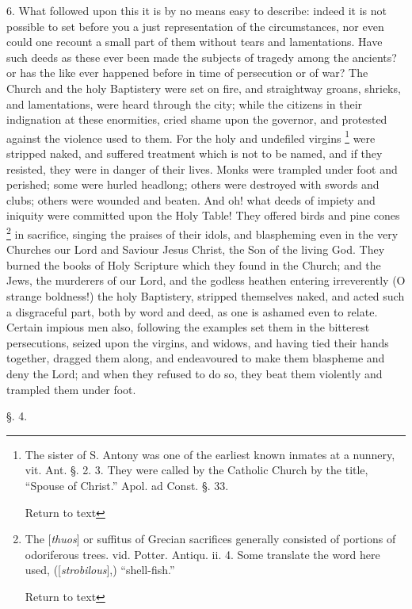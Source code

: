 6. What followed upon this it is by no means easy
to describe: indeed it is not possible to set before you a just
representation of the circumstances, nor even could one recount a
small part of them without tears and lamentations. Have such deeds as
these ever been made the subjects of tragedy among the ancients?
or has the like ever happened before in time of persecution or of war?
The Church and the holy Baptistery were set on fire, and straightway
groans, shrieks, and lamentations, were heard through the city; while
the citizens in their indignation at these enormities, cried shame
upon the governor, and protested against the violence used to them.
For the holy and undefiled virgins \footnote{The sister of S. Antony was one of the earliest known inmates at a
nunnery, vit. Ant. §. 2. 3. They were called by the Catholic Church
by the title, ``Spouse of Christ.'' Apol. ad Const. §. 33.

Return to text} were stripped naked, and suffered treatment which is not to be
named, and if they resisted, they were in danger of their lives. Monks
were trampled under foot and perished; some were hurled headlong;
others were destroyed with swords and clubs; others were wounded and
beaten. And oh! what deeds of impiety and iniquity were committed upon
the Holy Table! They offered birds and pine cones \footnote{The [\emph{thuos}] or suffitus of Grecian sacrifices generally
consisted of portions of odoriferous trees. vid. Potter. Antiqu. ii.
4. Some translate the word here used, ([\emph{strobilous}],) ``shell-fish.''

Return to text} in sacrifice, singing the praises of their idols, and
blaspheming even in the very Churches our Lord and Saviour Jesus
Christ, the Son of the living God. They burned the books of Holy
Scripture which they found in the Church; and the Jews, the murderers
of our Lord, and the godless heathen entering irreverently (O strange
boldness!) the holy Baptistery, stripped themselves naked, and acted
such a disgraceful part, both by word and deed, as one is ashamed even
to relate. Certain impious men also, following the examples set them
in the bitterest persecutions, seized upon the virgins, and widows,
and having tied their hands together, dragged them along, and
endeavoured to make them blaspheme and deny the Lord; and when they
refused to do so, they beat them violently and trampled them under
foot.

§. 4.

